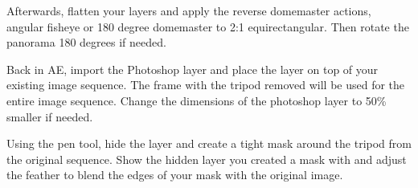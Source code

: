 \begin{fullwidth}
Afterwards, flatten your layers and apply the reverse domemaster actions, angular fisheye or 180 degree domemaster to 2:1 equirectangular. Then rotate the panorama 180 degrees if needed. 

Back in AE, import the Photoshop layer and place the layer on top of your existing image sequence. The frame with the tripod removed will be used for the entire image sequence. Change the dimensions of the photoshop layer to 50\% smaller if needed.


Using the pen tool, hide the layer and create a tight mask around the tripod from the original sequence. Show the hidden layer you created a mask with and adjust the feather to blend the edges of your mask with the original image.

\clearpage
\end{fullwidth}